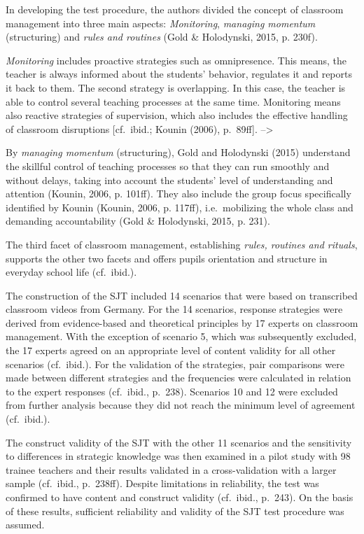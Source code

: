 \documentclass[
  man]{apa6}
\begin{document}
In developing the test procedure, the authors divided the concept of classroom management into three main aspects: \emph{Monitoring}, \emph{managing momentum} (structuring) and \emph{rules and routines} (Gold \& Holodynski, 2015, p. 230f).

\emph{Monitoring} includes proactive strategies such as omnipresence. This means, the teacher is always informed about the students' behavior, regulates it and reports it back to them. The second strategy is overlapping. In this case, the teacher is able to control several teaching processes at the same time. Monitoring means also reactive strategies of supervision, which also includes the effective handling of classroom disruptions {[}cf.~ibid.; Kounin (2006), p.~89ff{]}. --\textgreater{}

By \emph{managing momentum} (structuring), Gold and Holodynski (2015) understand the skillful control of teaching processes so that they can run smoothly and without delays, taking into account the students' level of understanding and attention (Kounin, 2006, p. 101ff). They also include the group focus specifically identified by Kounin (Kounin, 2006, p. 117ff), i.e.~mobilizing the whole class and demanding accountability (Gold \& Holodynski, 2015, p. 231).

The third facet of classroom management, establishing \emph{rules, routines and rituals}, supports the other two facets and offers pupils orientation and structure in everyday school life (cf.~ibid.).

The construction of the SJT included 14 scenarios that were based on transcribed classroom videos from Germany. For the 14 scenarios, response strategies were derived from evidence-based and theoretical principles by 17 experts on classroom management. With the exception of scenario 5, which was subsequently excluded, the 17 experts agreed on an appropriate level of content validity for all other scenarios (cf.~ibid.). For the validation of the strategies, pair comparisons were made between different strategies and the frequencies were calculated in relation to the expert responses (cf.~ibid., p.~238). Scenarios 10 and 12 were excluded from further analysis because they did not reach the minimum level of agreement (cf.~ibid.).

The construct validity of the SJT with the other 11 scenarios and the sensitivity to differences in strategic knowledge was then examined in a pilot study with 98 trainee teachers and their results validated in a cross-validation with a larger sample (cf.~ibid., p.~238ff). Despite limitations in reliability, the test was confirmed to have content and construct validity (cf.~ibid., p.~243). On the basis of these results, sufficient reliability and validity of the SJT test procedure was assumed.
\end{document}
